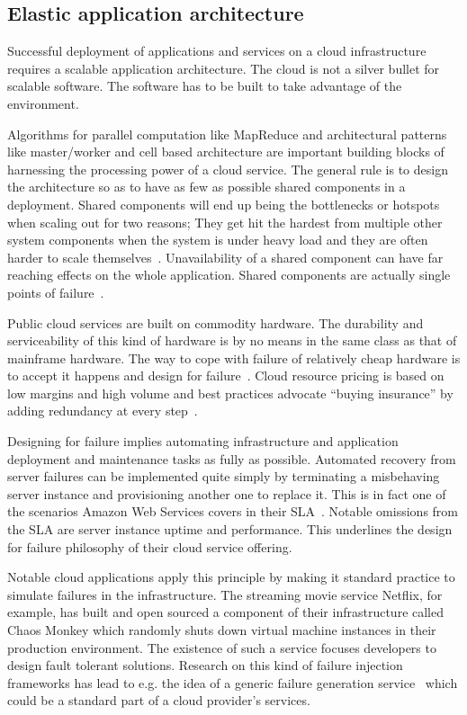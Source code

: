 \documentclass[english]{tktltiki2}
\theoremstyle{definition}
\theoremstyle{remark}
\begin{document}
\subsection{Elastic application architecture}
\label{sec:elasticApplicationArchitecture}

Successful deployment of applications and services on a cloud infrastructure
requires a scalable application architecture. The cloud is not a silver bullet
for scalable software. The software has to be built to take advantage of the
environment.

Algorithms for parallel computation like MapReduce and architectural patterns
like master/worker and cell based architecture  are important building blocks of
harnessing the processing power of a cloud service. The general rule is to
design the architecture so as to have as few as possible shared components in a
deployment. Shared components will end up being the bottlenecks or hotspots when
scaling out for two reasons; They get hit the hardest from multiple other system
components when the system is under heavy load and they are often harder to
scale themselves~\cite{caseforsharednothing}. Unavailability of a
shared component can have far reaching effects on the whole application. Shared
components are actually single points of failure~\cite{cloudarchitecturepatternsbook}.

Public cloud services are built on commodity hardware. The durability and
serviceability of this kind of hardware is by no means in the same class as that
of mainframe hardware. The way to cope with failure of relatively cheap hardware
is to accept it happens and design for
failure~\cite{cloudarchitecturepatternsbook}. Cloud resource pricing is based on
low margins and high volume and best practices advocate ``buying insurance'' by
adding redundancy at every step~\cite{Varia2010}.

Designing for failure implies automating infrastructure and application
deployment and maintenance tasks as fully as possible. Automated recovery from
server failures can be implemented quite simply by terminating a misbehaving
server instance and provisioning another one to replace it. This is in fact one
of the scenarios Amazon Web Services covers in their SLA~\cite{ec2sla}. Notable
omissions from the SLA are server instance uptime and performance. This
underlines the design for failure philosophy of their cloud service offering.

Notable cloud applications apply this principle by making it standard practice
to simulate failures in the infrastructure. The streaming movie service Netflix,
for example, has built and open sourced a component of their infrastructure
called Chaos Monkey which randomly shuts down virtual machine instances in their
production environment. The existence of such a service focuses developers to
design fault tolerant solutions. Research on this kind of failure injection
frameworks has lead to e.g. the idea of a generic failure generation
service~\cite{FAASBerkeleyTechRep} which could be a standard part of a cloud
provider's services.
\end{document}
